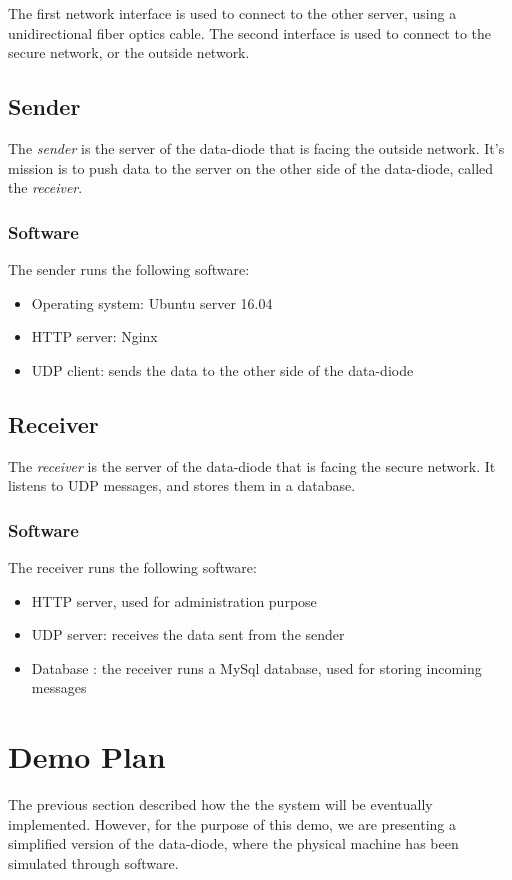\documentclass[a4paper,11pt]{article}
\begin{document}
The first network interface is used to connect to the other server, using a unidirectional fiber optics cable. The second interface is used to connect to the secure network, or the outside network.

\subsection{Sender}
The \textit{sender} is the server of the data-diode that is facing the outside network. It's mission is to push data to the server on the other side of the data-diode, called the \textit{receiver}.

\subsubsection{Software}
The sender runs the following software:
\begin{itemize}
	\item{Operating system: Ubuntu server 16.04}
	\item{HTTP server: Nginx}
	\item{UDP client: sends the data to the other side of the data-diode}
\end{itemize}

\subsection{Receiver}
The \textit{receiver} is the server of the data-diode that is facing the secure network. It listens to UDP messages, and stores them in a database.


\subsubsection{Software}
The receiver runs the following software:
\begin{itemize}
	\item{HTTP server, used for administration purpose}
	\item{UDP server: receives the data sent from the sender}
	\item{Database : the receiver runs a MySql database, used for storing incoming messages}
\end{itemize}


\section{Demo Plan}
The previous section described how the the system will be eventually implemented. However, for the purpose of this demo, we are presenting a simplified version of the data-diode, where the physical machine has been simulated through software.\\
\end{document}
